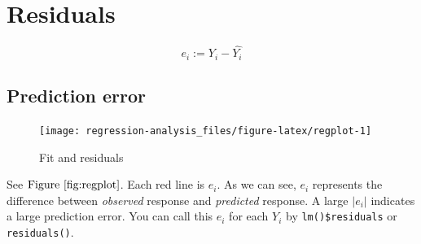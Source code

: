 \documentclass[]{book}
\newenvironment{Shaded}{\begin{snugshade}}{\end{snugshade}}
\newcommand{\DataTypeTok}[1]{\textcolor[rgb]{0.13,0.29,0.53}{#1}}
\newcommand{\FloatTok}[1]{\textcolor[rgb]{0.00,0.00,0.81}{#1}}
\newcommand{\KeywordTok}[1]{\textcolor[rgb]{0.13,0.29,0.53}{\textbf{#1}}}
\newcommand{\NormalTok}[1]{#1}
\newcommand{\OperatorTok}[1]{\textcolor[rgb]{0.81,0.36,0.00}{\textbf{#1}}}
\newcommand{\OtherTok}[1]{\textcolor[rgb]{0.56,0.35,0.01}{#1}}
\newcommand{\StringTok}[1]{\textcolor[rgb]{0.31,0.60,0.02}{#1}}
\theoremstyle{definition}
\theoremstyle{definition}
\theoremstyle{definition}
\theoremstyle{remark}
\let\BeginKnitrBlock\begin \let\EndKnitrBlock\end
\begin{document}
\hypertarget{residuals}{%
\section{Residuals}\label{residuals}}

\BeginKnitrBlock{definition}[Residuals]
\protect\hypertarget{def:res}{}{\label{def:res} {} }\[e_i := Y_i - \hat{Y_i}\]
\EndKnitrBlock{definition}

\hypertarget{prediction-error}{%
\subsection{Prediction error}\label{prediction-error}}

\begin{Shaded}
\end{Shaded}

\begin{figure}[H]

{\centering \texttt{[image: regression-analysis\_files/figure-latex/regplot-1]} 

}

\caption{Fit and residuals\label{fig:regplot}}\label{fig:regplot}
\end{figure}

See \(\text{Figure }\ref{fig:regplot}\). Each red line is \(e_i\). As we can see, \(e_i\) represents the difference between \emph{observed} response and \emph{predicted} response. A large \(\lvert e_i \rvert\) indicates a large prediction error. You can call this \(e_i\) for each \(Y_i\) by \texttt{lm()\$residuals} or \texttt{residuals()}.
\end{document}
